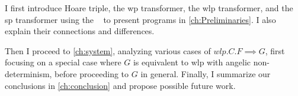 I first introduce Hoare triple, the wp transformer, the wlp transformer, and the sp transformer using the ~\cite{dijkstra75} to present programs in \autoref{ch:Preliminaries}. 
I also explain their connections and differences. 

Then I proceed to \autoref{ch:system}, analyzing various cases of $wlp.C.F{\implies} G$, first focusing on a special case where $G$ is equivalent to wlp with angelic non-determinism, before proceeding to $G$ in general.
Finally, I summarize our conclusions in \autoref{ch:conclusion} and propose possible future work. 








